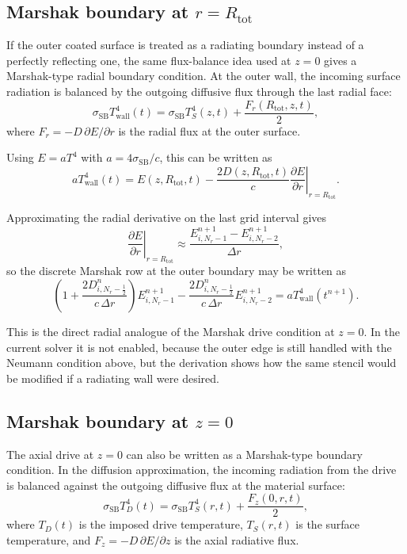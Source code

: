 \documentclass[11pt]{article}
\begin{document}
\subsection{Marshak boundary at $r=R_{\mathrm{tot}}$}

If the outer coated surface is treated as a radiating boundary instead of a perfectly
reflecting one, the same flux-balance idea used at $z=0$ gives a Marshak-type radial
boundary condition. At the outer wall, the incoming surface radiation is balanced by
the outgoing diffusive flux through the last radial face:
\begin{equation}
\sigma_{\mathrm{SB}} T_{\mathrm{wall}}^4(t)
=
\sigma_{\mathrm{SB}} T_S^4(z,t)
+
\frac{F_r(R_{\mathrm{tot}},z,t)}{2},
\end{equation}
where $F_r=-D\,\partial E/\partial r$ is the radial flux at the outer surface.

Using $E=aT^4$ with $a=4\sigma_{\mathrm{SB}}/c$, this can be written as
\begin{equation}
aT_{\mathrm{wall}}^4(t)
=
E(z,R_{\mathrm{tot}},t)
-
\frac{2D(z,R_{\mathrm{tot}},t)}{c}
\left.\frac{\partial E}{\partial r}\right|_{r=R_{\mathrm{tot}}}.
\end{equation}

Approximating the radial derivative on the last grid interval gives
\begin{equation}
\left.\frac{\partial E}{\partial r}\right|_{r=R_{\mathrm{tot}}}
\approx
\frac{E^{n+1}_{i,N_r-1}-E^{n+1}_{i,N_r-2}}{\Delta r},
\end{equation}
so the discrete Marshak row at the outer boundary may be written as
\begin{equation}
\left(
1 + \frac{2D^n_{i,N_r-\frac12}}{c\,\Delta r}
\right)E^{n+1}_{i,N_r-1}
-
\frac{2D^n_{i,N_r-\frac12}}{c\,\Delta r}E^{n+1}_{i,N_r-2}
=
aT_{\mathrm{wall}}^4(t^{n+1}).
\end{equation}

This is the direct radial analogue of the Marshak drive condition at $z=0$.
In the current solver it is not enabled, because the outer edge is still handled
with the Neumann condition above, but the derivation shows how the same stencil
would be modified if a radiating wall were desired.

\subsection{Marshak boundary at $z=0$}

The axial drive at $z=0$ can also be written as a Marshak-type boundary condition.
In the diffusion approximation, the incoming radiation from the drive is balanced
against the outgoing diffusive flux at the material surface:
\begin{equation}
\sigma_{\mathrm{SB}} T_D^4(t)
=
\sigma_{\mathrm{SB}} T_S^4(r,t)
+
\frac{F_z(0,r,t)}{2},
\end{equation}
where $T_D(t)$ is the imposed drive temperature, $T_S(r,t)$ is the surface temperature,
and $F_z=-D\,\partial E/\partial z$ is the axial radiative flux.
\end{document}
